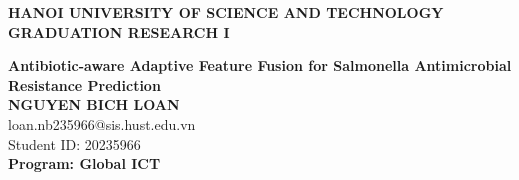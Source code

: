\documentclass[Main.tex]{subfiles}
\begin{document}
\begin{titlepage}
\thispagestyle{empty}
\begin{center}

{\textbf{\large{HANOI UNIVERSITY OF SCIENCE AND TECHNOLOGY }}}\\[4cm]

{\textbf{\huge{GRADUATION RESEARCH I}}}\\[1cm]
{\textbf{\Large{Antibiotic-aware Adaptive Feature Fusion for Salmonella Antimicrobial Resistance Prediction}}\\[1cm]

{\textbf{\large{NGUYEN BICH LOAN}}}\\
{\large{loan.nb235966@sis.hust.edu.vn}}\\
{\large{Student ID: 20235966}}\\[0.5cm]

{\textbf{\large{Program: Global ICT}}}\\

\vspace{4cm}
\begin{table}[H]
\centering
{}
\end{table}}
\end{center}



\end{titlepage}
\end{document}
